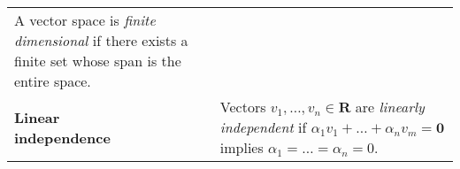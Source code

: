 \documentclass[10pt, a4paper, landscape]{article}
\newcommand{\defn}[1]{\textbf{#1}}
\newcommand{\set}[1]{\mathbold{#1}}
\begin{document}
\begin{multicols*}{3}
\begin{tabularx}{\columnwidth}{@{}l>{\raggedright\arraybackslash}X@{}}
  A vector space is \emph{finite dimensional} if there exists a finite set whose span is the entire space. \\

  \parbox[t]{0.8in}{\defn{Linear\\ independence}} & Vectors $v_1, \dots, v_n \in \set{R}$ are \emph{linearly independent} if $\alpha_1 v_1 + \dots + \alpha_n v_m = \set{0}$ implies $\alpha_1 = \dots = \alpha_n=0$. \\
  
\end{tabularx}

\end{multicols*}
\end{document}
